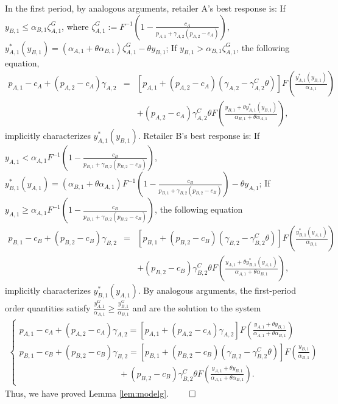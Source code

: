 \documentclass[nonblindrev,copyedit]{informs1}
\begin{document}
\begin{APPENDICES}
In the first period, by analogous arguments, retailer A's best response is: If $y_{B,1} \leq \alpha_{B,1} \zeta^G_{A,1}$, where $\zeta^G_{A,1} := F^{-1}\left( 1- \frac{c_A}{p_{A,1} + \gamma_{A,2} (p_{A,2} -c_A)} \right)$, $y_{A,1}^*(y_{B,1}) = (\alpha_{A,1} + \theta \alpha_{B,1}) \zeta^G_{A,1} - \theta y_{B,1}$; If $y_{B,1} > \alpha_{B,1} \zeta^G_{A,1}$, the following equation,
\begin{eqnarray*}
    p_{A,1} -c_A + (p_{A,2} -c_A)\gamma_{A,2} & = & [p_{A,1} + (p_{A,2} -c_A) (\gamma_{A,2}- \gamma^C_{A,2} \theta)] F\left(\frac{y_{A,1}^*(y_{B,1})}{\alpha_{A,1}} \right) \nonumber \\
    & & +  (p_{A,2} -c_A)\gamma^C_{A,2}  \theta F \left(\frac{y_{B,1} + \theta y_{A,1}^*(y_{B,1})}{\alpha_{B,1}+\theta \alpha_{A,1}} \right),
\end{eqnarray*}
implicitly characterizes $y_{A,1}^*(y_{B,1})$. Retailer B's best response is: If $y_{A,1} < \alpha_{A,1} F^{-1}\left( 1- \frac{c_B}{p_{B,1} + \gamma_{B,2} (p_{B,2} -c_B)} \right)$, $y_{B,1}^*(y_{A,1}) = (\alpha_{B,1} + \theta \alpha_{A,1}) F^{-1}\left( 1- \frac{c_B}{p_{B,1} + \gamma_{B,2} (p_{B,2} -c_B)} \right) - \theta y_{A,1}$; If $y_{A,1} \geq \alpha_{A,1} F^{-1}\left( 1- \frac{c_B}{p_{B,1} + \gamma_{B,2}  (p_{B,2} -c_B)} \right)$, the following equation
\begin{eqnarray*}
    p_{B,1} -c_B + (p_{B,2} -c_B) \gamma_{B,2}  & = & [p_{B,1} + (p_{B,2} -c_B)(\gamma_{B,2} - \gamma^C_{B,2} \theta)] F\left(\frac{y_{B,1}^*(y_{A,1})}{\alpha_{B,1}} \right) \nonumber \\
    & &+ (p_{B,2} -c_B) \gamma^C_{B,2} \theta F \left(\frac{y_{A,1} + \theta y_{B,1}^*(y_{A,1})}{\alpha_{A,1}+\theta \alpha_{B,1}} \right),
\end{eqnarray*}
implicitly characterizes $y_{B,1}^*(y_{A,1})$. By analogous arguments, the first-period order quantities satisfy $\frac{y^G_{A,1}}{\alpha_{A,1}} \geq \frac{y^G_{B,1}}{\alpha_{B,1}}$ and are the solution to the system
\begin{eqnarray*} \label{modelg:eq1}
    \begin{cases}
        p_{A,1} - c_A + (p_{A,2} -c_A)\gamma_{A,2} = [p_{A,1} + (p_{A,2} -c_A)\gamma_{A,2}] F \left(\frac{y_{A,1} + \theta y_{B,1}}{\alpha_{A,1}+\theta \alpha_{B,1}} \right)
        \\
        p_{B,1} -c_B + (p_{B,2} -c_B) \gamma_{B,2} =  [p_{B,1} + (p_{B,2} -c_B)(\gamma_{B,2} - \gamma^C_{B,2} \theta)] F\left(\frac{y_{B,1}}{\alpha_{B,1}} \right) \\
        \hspace{140pt} + (p_{B,2} -c_B)\gamma^C_{B,2} \theta F \left(\frac{y_{A,1} + \theta y_{B,1}}{\alpha_{A,1}+\theta \alpha_{B,1}} \right).
    \end{cases}
\end{eqnarray*}
Thus, we have proved Lemma \ref{lem:modelg}. $\qed$


\end{APPENDICES}
\end{document}
